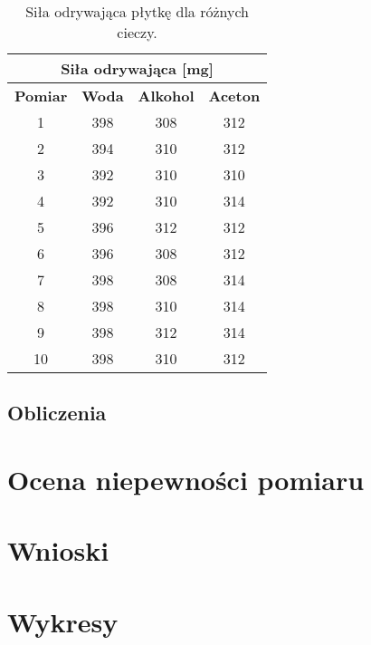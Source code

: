 \documentclass[a4paper,12pt]{article}
\begin{document}
\begin{table}[h!]
    \centering
    \begin{tabular}{|c|c|c|c|}
        \hline
        \multicolumn{4}{|c|}{\textbf{Siła odrywająca [mg]}} \\
        \hline
        \textbf{Pomiar} & \textbf{Woda} & \textbf{Alkohol} & \textbf{Aceton} \\
        \hline
        1 & 398 & 308 & 312 \\
        \hline
        2 & 394 & 310 & 312 \\
        \hline
        3 & 392 & 310 & 310 \\
        \hline
        4 & 392 & 310 & 314 \\
        \hline
        5 & 396 & 312 & 312 \\
        \hline
        6 & 396 & 308 & 312 \\
        \hline
        7 & 398 & 308 & 314 \\
        \hline
        8 & 398 & 310 & 314 \\
        \hline
        9 & 398 & 312 & 314 \\
        \hline
        10 & 398 & 310 & 312 \\
        \hline
    \end{tabular}
    \caption{Siła odrywająca płytkę dla różnych cieczy.}
    \label{tab:sila_odrywania}
\end{table}


\subsection{Obliczenia}

\section{Ocena niepewności pomiaru}

\section{Wnioski}

\section{Wykresy}



\end{document}
